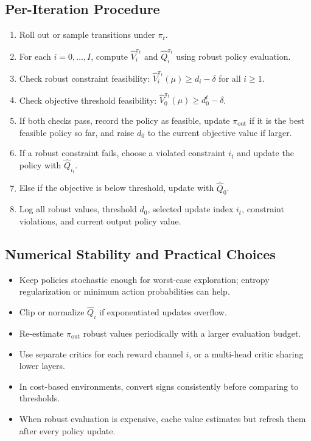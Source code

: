 \documentclass[11pt]{article}
\newcommand{\1}{\mathbf 1}
\begin{document}
\subsection{Per-Iteration Procedure}
\begin{enumerate}[leftmargin=2em]
    \item Roll out or sample transitions under $\pi_t$.
    \item For each $i=0,\ldots,I$, compute $\widehat V_i^{\pi_t}$ and $\widehat Q_i^{\pi_t}$ using robust policy evaluation.
    \item Check robust constraint feasibility: $\widehat V_i^{\pi_t}(\mu)\ge d_i-\delta$ for all $i\ge1$.
    \item Check objective threshold feasibility: $\widehat V_0^{\pi_t}(\mu)\ge d_0^t-\delta$.
    \item If both checks pass, record the policy as feasible, update $\pi_{\mathrm{out}}$ if it is the best feasible policy so far, and raise $d_0$ to the current objective value if larger.
    \item If a robust constraint fails, choose a violated constraint $i_t$ and update the policy with $\widehat Q_{i_t}$.
    \item Else if the objective is below threshold, update with $\widehat Q_0$.
    \item Log all robust values, threshold $d_0$, selected update index $i_t$, constraint violations, and current output policy value.
\end{enumerate}

\subsection{Numerical Stability and Practical Choices}
\begin{itemize}[leftmargin=2em]
    \item Keep policies stochastic enough for worst-case exploration; entropy regularization or minimum action probabilities can help.
    \item Clip or normalize $\widehat Q_i$ if exponentiated updates overflow.
    \item Re-estimate $\pi_{\mathrm{out}}$ robust values periodically with a larger evaluation budget.
    \item Use separate critics for each reward channel $i$, or a multi-head critic sharing lower layers.
    \item In cost-based environments, convert signs consistently before comparing to thresholds.
    \item When robust evaluation is expensive, cache value estimates but refresh them after every policy update.
\end{itemize}
\end{document}
